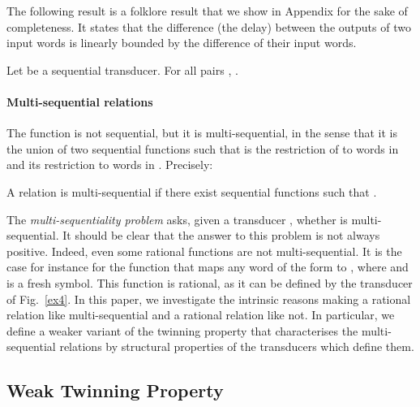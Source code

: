 \documentclass[envcountsame]{llncs}
\begin{document}
The following result is a folklore result that we show in Appendix for the
sake of completeness. It states that the difference
(the delay) between the outputs of 
two input words is linearly bounded by the difference of their
input words. 
  
\vspace{-1mm}
\begin{proposition}\label{bounded_variation}
Let  be a sequential transducer. For all pairs , .
\end{proposition}

\vspace{-4mm}
\paragraph{Multi-sequential relations} The function  is not
sequential, but it is multi-sequential, in the sense that it is the
union of two sequential functions  such that  is the
restriction of  to words in  and  its restriction
to words in . Precisely:

\begin{definition}
    A relation  is
    multi-sequential if there exist  sequential functions
     such that . 
\end{definition}

The \emph{multi-sequentiality problem} asks, given a transducer ,
whether  is multi-sequential. It should be clear that
the answer to this problem is not always positive. Indeed, even some
rational functions are not multi-sequential. It is the case
for instance for the function  that maps any word of the
form  to , where  and  is a
fresh symbol. This function is rational, as it can be defined by the
transducer of Fig.~\ref{ex4}. In this paper, we investigate the intrinsic reasons
making a rational relation like  multi-sequential and a
rational relation like  not. In particular, we define a
weaker variant of the twinning property that characterises the
multi-sequential relations by structural properties of the transducers
which define them. 

\vspace{-5mm} 
\subsection{Weak Twinning Property}
\vspace{-1mm} 
\end{document}
